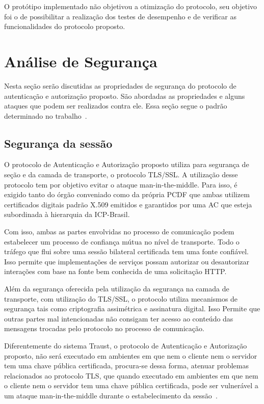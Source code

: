 O protótipo implementado não objetivou a otimização do protocolo, seu objetivo foi o de possibilitar a realização dos testes de desempenho e de verificar as funcionalidades do protocolo proposto.

\section{Análise de Segurança}

Nesta seção serão discutidas as propriedades de segurança do protocolo de autenticação e autorização proposto. São abordadas as propriedades e alguns ataques que podem ser realizados contra ele. Essa seção segue o padrão determinado no trabalho~\cite{traust08}.

\subsection{Segurança da sessão}

O protocolo de Autenticação e Autorização proposto utiliza para segurança de seção e da camada de transporte, o protocolo TLS/SSL. A utilização desse protocolo tem por objetivo evitar o ataque man-in-the-middle. Para isso, é exigido tanto do órgão conveniado como da própria PCDF que ambas utilizem certificados digitais padrão X.509 emitidos e garantidos por uma AC que esteja subordinada à hierarquia da ICP-Brasil.

Com isso, ambas as partes envolvidas no processo de comunicação podem estabelecer um processo de confiança mútua no nível de transporte. Todo o tráfego que flui sobre uma sessão bilateral certificada tem uma fonte confiável. Isso permite que implementações de serviços possam autorizar ou desautorizar interações com base na fonte bem conhecida de uma solicitação HTTP.

Além da segurança oferecida pela utilização da segurança na camada de transporte, com utilização do TLS/SSL, o protocolo utiliza mecanismos de segurança tais como criptografia assimétrica e assinatura digital. Isso Permite que outras partes mal intencionadas não consigam ter acesso ao conteúdo das mensagens trocadas pelo protocolo no processo de comunicação.

Diferentemente do sistema Traust, o protocolo de Autenticação e Autorização proposto, não será executado em ambientes em que nem o cliente nem o servidor tem uma chave pública certificada, procura-se dessa forma, atenuar problemas relacionados ao protocolo TLS, que quando executado em ambientes em que nem o cliente nem o servidor tem uma chave pública certificada, pode ser vulnerável a um ataque man-in-the-middle durante o estabelecimento da sessão~\cite{traust08}.

